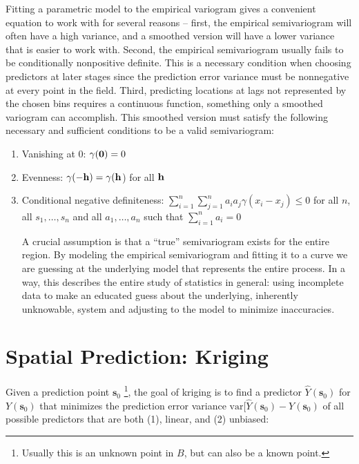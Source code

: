\documentclass[12pt,twoside]{reedthesis}
\begin{document}
Fitting a parametric model to the empirical variogram gives a convenient equation to work with for several reasons -- first, the empirical semivariogram will often have a high variance, and a smoothed version will have a lower variance that is easier to work with. Second, the empirical semivariogram usually fails to be conditionally nonpositive definite. This is a necessary condition when choosing predictors at later stages since the prediction error variance must be nonnegative at every point in the field. Third, predicting locations at lags not represented by the chosen bins requires a continuous function, something only a smoothed variogram can accomplish. This smoothed version must satisfy the following necessary and sufficient conditions to be a valid semivariogram: \\

\begin{enumerate}

\item Vanishing at 0: $\gamma(\bold{0}) = 0$
\item Evenness: $\gamma(-\bold{h}) = \gamma(\bold{h}$) for all $\bold{h}$
\item Conditional negative definiteness: $\sum_{i=1}^n \sum_{j=1}^n a_i a_j \gamma(x_i - x_j) \leq 0$ for all $n$, all $s_1, \dots, s_n$ and all $a_1, \dots, a_n$ such that $\sum_{i=1}^n a_i = 0$

A crucial assumption is that a ``true'' semivariogram exists for the entire region. By modeling the empirical semivariogram and fitting it to a curve we are guessing at the underlying model that represents the entire process. In a way, this describes the entire study of statistics in general: using incomplete data to make an educated guess about the underlying, inherently unknowable, system and adjusting to the model to minimize inaccuracies.

\end{enumerate}



\section{Spatial Prediction: Kriging}
Given a prediction point $\mathbf{s}_0$ \footnote{Usually this is an unknown point in $B$, but can also be a known point.}, the goal of kriging is to find a predictor $\hat Y(\mathbf{s}_0)$ for $Y(\mathbf{s}_0)$ that minimizes the prediction error variance $\text{var}[\hat Y(\mathbf{s}_0) - Y(\mathbf{s}_0)$ of all possible predictors that are both (1), linear, and  (2) unbiased:
\end{document}

